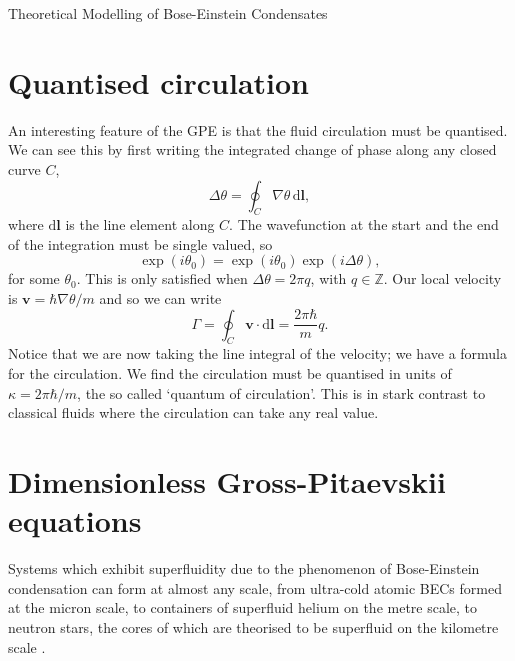 \begin{chapter}{\label{cha:theoretical_model}Theoretical Modelling of Bose-Einstein Condensates}
\section{\label{section:quantisedcirculation} Quantised circulation}
An interesting feature of the GPE is that the fluid circulation must be quantised. We can see this by first writing the integrated change of phase along any closed curve $C$,
\begin{equation}
	\Delta\theta = \oint_C \! \nabla \theta  \, \mathrm{d}\mathbf{l},
\end{equation}
where $\mathrm{d}\mathbf{l}$ is the line element along $C$. The wavefunction at the start and the end of the integration must be single valued, so
\begin{equation}
	\exp (i\theta_0) = \exp (i\theta_0)\exp (i\Delta\theta),
\end{equation}
for some $\theta_0$. This is only satisfied when $\Delta\theta = 2\pi q$, with $q\in\mathbb{Z}$. Our local velocity is $\mathbf{v} = \hbar\nabla\theta/m $ and so we can write
\begin{equation}
	\Gamma = \oint_C \! \mathbf{v} \cdot \mathrm{d}\mathbf{l} = \frac{2 \pi \hbar}{m}q.
\end{equation}
Notice that we are now taking the line integral of the velocity; we have a formula for the circulation. We find the circulation must be quantised in units of $\kappa = 2 \pi \hbar/m$, the so called `quantum of circulation'. This is in stark contrast to classical fluids where the circulation can take any real value.

\section{\label{section:gpedimless} Dimensionless Gross-Pitaevskii equations}
	Systems which exhibit superfluidity due to the phenomenon of Bose-Einstein condensation can form at almost any scale, from ultra-cold atomic BECs formed at the micron scale, %
	to containers of superfluid helium on the metre scale, to neutron stars, the cores of which are theorised to be superfluid on the kilometre scale \cite{Warszawski01082011}.


\end{chapter}
